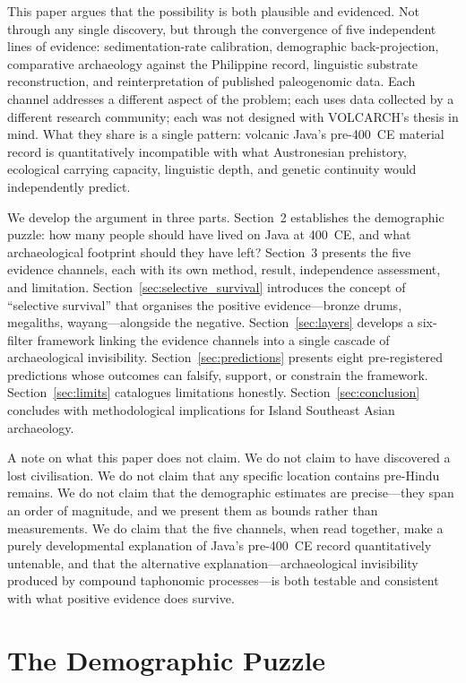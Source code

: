 \documentclass[12pt,a4paper]{article}
\begin{document}
This paper argues that the possibility is both plausible and evidenced. Not through any single discovery, but through the convergence of five independent lines of evidence: sedimentation-rate calibration, demographic back-projection, comparative archaeology against the Philippine record, linguistic substrate reconstruction, and reinterpretation of published paleogenomic data. Each channel addresses a different aspect of the problem; each uses data collected by a different research community; each was not designed with VOLCARCH's thesis in mind. What they share is a single pattern: volcanic Java's pre-400~CE material record is quantitatively incompatible with what Austronesian prehistory, ecological carrying capacity, linguistic depth, and genetic continuity would independently predict.

We develop the argument in three parts. Section~2 establishes the demographic puzzle: how many people should have lived on Java at 400~CE, and what archaeological footprint should they have left? Section~3 presents the five evidence channels, each with its own method, result, independence assessment, and limitation. Section~\ref{sec:selective_survival} introduces the concept of ``selective survival'' that organises the positive evidence---bronze drums, megaliths, wayang---alongside the negative. Section~\ref{sec:layers} develops a six-filter framework linking the evidence channels into a single cascade of archaeological invisibility. Section~\ref{sec:predictions} presents eight pre-registered predictions whose outcomes can falsify, support, or constrain the framework. Section~\ref{sec:limits} catalogues limitations honestly. Section~\ref{sec:conclusion} concludes with methodological implications for Island Southeast Asian archaeology.

A note on what this paper does not claim. We do not claim to have discovered a lost civilisation. We do not claim that any specific location contains pre-Hindu remains. We do not claim that the demographic estimates are precise---they span an order of magnitude, and we present them as bounds rather than measurements. We do claim that the five channels, when read together, make a purely developmental explanation of Java's pre-400~CE record quantitatively untenable, and that the alternative explanation---archaeological invisibility produced by compound taphonomic processes---is both testable and consistent with what positive evidence does survive.


\section{The Demographic Puzzle}
\label{sec:puzzle}
\end{document}
